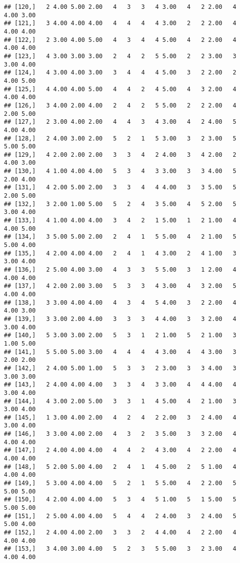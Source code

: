 \documentclass[]{article}
\begin{document}
\begin{verbatim}
## [120,]   2 4.00 5.00 2.00   4   3   3   4 3.00   4   2 2.00   4 4.00 3.00
## [121,]   3 4.00 4.00 4.00   4   4   4   4 3.00   2   2 2.00   4 4.00 4.00
## [122,]   2 3.00 4.00 5.00   4   3   4   4 5.00   4   2 2.00   4 4.00 4.00
## [123,]   4 3.00 3.00 3.00   2   4   2   5 5.00   2   2 3.00   3 3.00 4.00
## [124,]   4 3.00 4.00 3.00   3   4   4   4 5.00   3   2 2.00   2 4.00 5.00
## [125,]   4 4.00 4.00 5.00   4   4   2   4 5.00   4   3 2.00   4 4.00 4.00
## [126,]   3 4.00 2.00 4.00   2   4   2   5 5.00   2   2 2.00   4 2.00 5.00
## [127,]   2 3.00 4.00 2.00   4   4   3   4 3.00   4   2 4.00   5 4.00 4.00
## [128,]   2 4.00 3.00 2.00   5   2   1   5 3.00   3   2 3.00   5 5.00 5.00
## [129,]   4 2.00 2.00 2.00   3   3   4   2 4.00   3   4 2.00   2 4.00 3.00
## [130,]   4 1.00 4.00 4.00   5   3   4   3 3.00   3   3 4.00   5 2.00 4.00
## [131,]   4 2.00 5.00 2.00   3   3   4   4 4.00   3   3 5.00   5 2.00 5.00
## [132,]   3 2.00 1.00 5.00   5   2   4   3 5.00   4   5 2.00   5 3.00 4.00
## [133,]   4 1.00 4.00 4.00   3   4   2   1 5.00   1   2 1.00   4 4.00 5.00
## [134,]   3 5.00 5.00 2.00   2   4   1   5 5.00   4   2 1.00   5 5.00 4.00
## [135,]   4 2.00 4.00 4.00   2   4   1   4 3.00   2   4 1.00   3 3.00 4.00
## [136,]   2 5.00 4.00 3.00   4   3   3   5 5.00   3   1 2.00   4 4.00 4.00
## [137,]   4 2.00 2.00 3.00   5   3   3   4 3.00   4   3 2.00   5 4.00 4.00
## [138,]   3 3.00 4.00 4.00   4   3   4   5 4.00   3   2 2.00   4 4.00 3.00
## [139,]   3 3.00 2.00 4.00   3   3   3   4 4.00   3   3 2.00   4 3.00 4.00
## [140,]   5 3.00 3.00 2.00   5   3   1   2 1.00   5   2 1.00   3 1.00 5.00
## [141,]   5 5.00 5.00 3.00   4   4   4   4 3.00   4   4 3.00   3 2.00 2.00
## [142,]   2 4.00 5.00 1.00   5   3   3   2 3.00   3   3 4.00   3 3.00 3.00
## [143,]   2 4.00 4.00 4.00   3   3   4   3 3.00   4   4 4.00   4 3.00 4.00
## [144,]   4 3.00 2.00 5.00   3   3   1   4 5.00   4   2 1.00   3 3.00 4.00
## [145,]   1 3.00 4.00 2.00   4   2   4   2 2.00   3   2 4.00   4 3.00 4.00
## [146,]   3 3.00 4.00 2.00   4   3   2   3 5.00   3   3 2.00   4 4.00 4.00
## [147,]   2 4.00 4.00 4.00   4   4   2   4 3.00   4   2 2.00   4 4.00 4.00
## [148,]   5 2.00 5.00 4.00   2   4   1   4 5.00   2   5 1.00   4 4.00 4.00
## [149,]   5 3.00 4.00 4.00   5   2   1   5 5.00   4   2 2.00   5 5.00 5.00
## [150,]   4 2.00 4.00 4.00   5   3   4   5 1.00   5   1 5.00   5 5.00 5.00
## [151,]   2 5.00 4.00 4.00   5   4   4   2 4.00   3   2 4.00   5 5.00 4.00
## [152,]   2 4.00 4.00 2.00   3   3   2   4 4.00   4   2 2.00   4 4.00 4.00
## [153,]   3 4.00 3.00 4.00   5   2   3   5 5.00   3   2 3.00   4 4.00 4.00

\end{verbatim}
\end{document}
